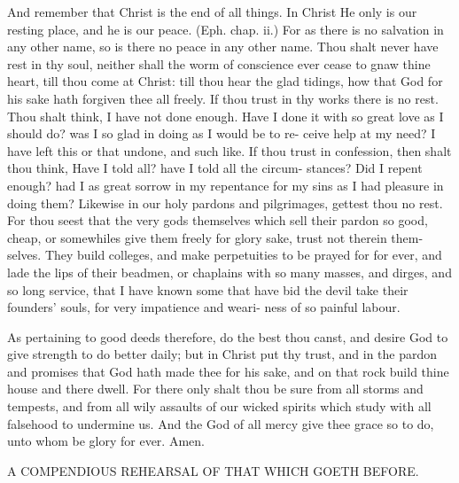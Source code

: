 \documentclass{custom}
\begin{document}
And remember that Christ is the end of all things. In Christ 
He only is our resting place, and he is our peace.
(Eph. chap. ii.) For as there is no salvation in any other
name, so is there no peace in any other name. Thou 
shalt never have rest in thy soul, neither shall the worm of 
conscience ever cease to gnaw thine heart, till thou come 
at Christ: till thou hear the glad tidings, how that God 
for his sake hath forgiven thee all freely. If thou trust in 
thy works there is no rest. Thou shalt think, I have not 
done enough. Have I done it with so great love as I 
should do? was I so glad in doing as I would be to re- 
ceive help at my need? I have left this or that undone, and 
such like. If thou trust in confession, then shalt thou 
think, Have I told all? have I told all the circum- 
stances? Did I repent enough? had I as great sorrow in 
my repentance for my sins as I had pleasure in doing them? 
Likewise in our holy pardons and pilgrimages, gettest thou 
no rest. For thou seest that the very gods themselves 
which sell their pardon so good, cheap, or somewhiles 
give them freely for glory sake, trust not therein them- 
selves. They build colleges, and make perpetuities to be 
prayed for for ever, and lade the lips of their beadmen, 
or chaplains with so many masses, and dirges, and so long 
service, that I have known some that have bid the devil 
take their founders' souls, for very impatience and weari-
ness of so painful labour. 

As pertaining to good deeds therefore, do the best
thou canst, and desire God to give strength to do better
daily; but in Christ put thy trust, and in the pardon
and promises that God hath made thee for his sake, and 
on that rock build thine house and there dwell. For there 
only shalt thou be sure from all storms and tempests, and 
from all wily assaults of our wicked spirits which study with 
all falsehood to undermine us. And the God of all mercy 
give thee grace so to do, unto whom be glory for ever. Amen. 


A COMPENDIOUS REHEARSAL OF THAT WHICH 
GOETH BEFORE. 
\end{document}
